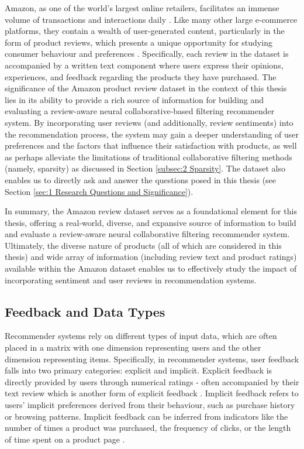 Amazon, as one of the world's largest online retailers, facilitates an immense volume of transactions and interactions daily \cite{kaushik2018exploring}. Like many other large e-commerce platforms, they contain a wealth of user-generated content, particularly in the form of product reviews, which presents a unique opportunity for studying consumer behaviour and preferences \cite{kaushik2018exploring}. Specifically, each review in the dataset is accompanied by a written text component where users express their opinions, experiences, and feedback regarding the products they have purchased. The significance of the Amazon product review dataset in the context of this thesis lies in its ability to provide a rich source of information for building and evaluating a review-aware neural collaborative-based filtering recommender system. By incorporating user reviews (and additionally, review sentiments) into the recommendation process, the system may gain a deeper understanding of user preferences and the factors that influence their satisfaction with products, as well as perhaps alleviate the limitations of traditional collaborative filtering methods (namely, sparsity) as discussed in Section \ref{subsec:2 Sparsity}. The dataset also enables us to directly ask and answer the questions posed in this thesis (see Section \ref{sec:1 Research Questions and Significance}). 

In summary, the Amazon review dataset serves as a foundational element for this thesis, offering a real-world, diverse, and expansive source of information to build and evaluate a review-aware neural collaborative filtering recommender system. Ultimately, the diverse nature of products (all of which are considered in this thesis) and wide array of information (including review text and product ratings) available within the Amazon dataset enables us to effectively study the impact of incorporating sentiment and user reviews in recommendation systems. 


\subsection{Feedback and Data Types}
\label{subsubsec:3 Feedback and Data Types}

Recommender systems rely on different types of input data, which are often placed in a matrix with one dimension representing users and the other dimension representing items. Specifically, in recommender systems, user feedback falls into two primary categories: explicit and implicit. Explicit feedback is directly provided by users through numerical ratings - often accompanied by their text review which is another form of explicit feedback \cite{koren2009collaborative}. Implicit feedback refers to users' implicit preferences derived from their behaviour, such as purchase history or browsing patterns. Implicit feedback can be inferred from indicators like the number of times a product was purchased, the frequency of clicks, or the length of time spent on a product page \cite{koren2009collaborative}. 

